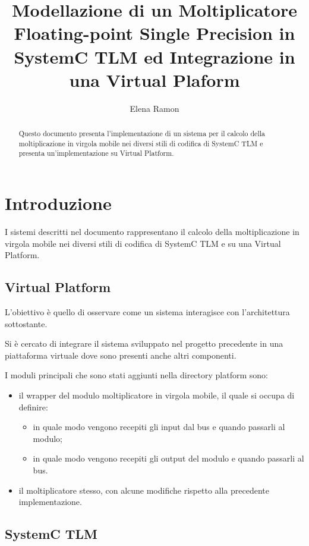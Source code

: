 \documentclass[]{IEEEtran}
\title{Modellazione di un Moltiplicatore Floating-point Single Precision in SystemC TLM ed Integrazione in una Virtual Plaform}
\author{Elena Ramon}
\begin{document}
	\maketitle
	
	\begin{abstract}
		Questo documento presenta l'implementazione di un sistema per il calcolo della moltiplicazione in virgola mobile nei diversi stili di codifica di SystemC TLM e presenta un'implementazione su Virtual Platform.
	\end{abstract}
		
	\section{Introduzione}
	
	I sistemi descritti nel documento rappresentano il calcolo della moltiplicazione in virgola mobile nei diversi stili di codifica di SystemC TLM e su una Virtual Platform.

	\subsection{Virtual Platform}

	L'obiettivo \`e quello di osservare come un sistema interagisce con l'architettura sottostante. 

	Si \`e cercato di integrare il sistema sviluppato nel progetto precedente in una piattaforma virtuale dove sono presenti anche altri componenti. 
	
	I moduli principali che sono stati aggiunti nella directory platform sono:
	\begin{itemize}
		\item il wrapper del modulo moltiplicatore in virgola mobile, il quale si occupa di definire:
		\begin{itemize}
			\item in quale modo vengono recepiti gli input dal bus e quando passarli al modulo;
			\item in quale modo vengono recepiti gli output del modulo e quando passarli al bus.
		\end{itemize}
		\item il moltiplicatore stesso, con alcune modifiche rispetto alla precedente implementazione.
	\end{itemize}	

	\subsection{SystemC TLM}
\end{document}
